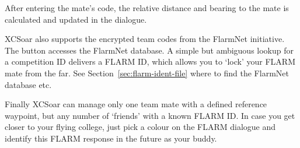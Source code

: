 After entering the mate's code, the relative distance and 
bearing to the mate is calculated and updated in the dialogue.

XCSoar also supports the encrypted team codes from the FlarmNet initiative.
The  button accesses the FlarmNet database. A simple but 
ambiguous lookup for a competition ID delivers a FLARM ID, which allows you 
to `lock' your FLARM mate from the far. See Section~\ref{sec:flarm-ident-file} 
where to find the FlarmNet database etc.

Finally XCSoar can manage only one team mate with a defined reference waypoint, 
but any number of `friends' with a known FLARM ID. In case you get closer to 
your flying college, just pick a colour on the FLARM dialogue and identify this 
FLARM response in the future as your buddy.



